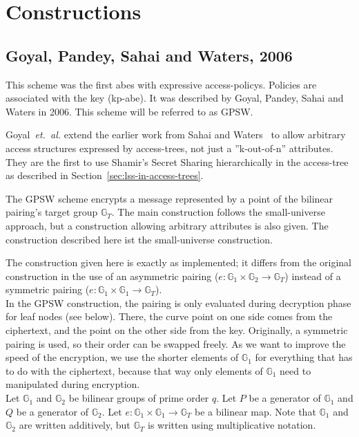 \chapter{Constructions}\label{sec:concrete-schemes} 
\section{Goyal, Pandey, Sahai and Waters, 2006}
This scheme was the first \acrshort{abes} with expressive \glspl{access-policy}. Policies are associated with the key (\acrshort{kp-abe}).
It was described by Goyal, Pandey, Sahai and Waters \cite{goyal_attribute-based_2006} in 2006. This scheme will be referred to as GPSW.

Goyal~\emph{et.~al.} extend the earlier work from Sahai and Waters~\cite{sahai_fuzzy_2005} to allow arbitrary access structures expressed by \glspl{access-tree}, not just a ''k-out-of-n'' attributes.
They are the first to use Shamir's Secret Sharing hierarchically in the \gls{access-tree} as described in Section~\ref{sec:lss-in-access-trees}. 

The GPSW scheme encrypts a message represented by a point of the bilinear pairing's target group $\mathbb{G}_T$.
The main construction follows the \gls{small-universe} approach, but a construction allowing arbitrary attributes is also given.
The construction described here ist the \gls{small-universe} construction.

The construction given here is exactly as implemented; it differs from the original construction in the use of an asymmetric pairing ($e: \mathbb{G}_1 \times \mathbb{G}_2 \rightarrow \mathbb{G}_T$) instead of a symmetric pairing ($e: \mathbb{G}_1 \times \mathbb{G}_1 \rightarrow \mathbb{G}_T$).\\
In the GPSW construction, the pairing is only evaluated during decryption phase for leaf nodes (see below).
There, the curve point on one side comes from the ciphertext, and the point on the other side from the key.
Originally, a symmetric pairing is used, so their order can be swapped freely.
As we want to improve the speed of the encryption, we use the shorter elements of $\mathbb{G}_1$ for everything that has to do with the ciphertext, because that way only elements of $\mathbb{G}_1$ need to manipulated during encryption. \\

Let $\mathbb{G}_1$ and $\mathbb{G}_2$ be bilinear groups of prime order $q$. Let $P$ be a generator of $\mathbb{G}_1$ and $Q$ be a generator of $\mathbb{G}_2$. Let $e: \mathbb{G}_1 \times \mathbb{G}_1 \rightarrow \mathbb{G}_T$ be a bilinear map.
Note that $\mathbb{G}_1$ and $\mathbb{G}_2$ are written additively, but $\mathbb{G}_T$ is written using multiplicative notation.

